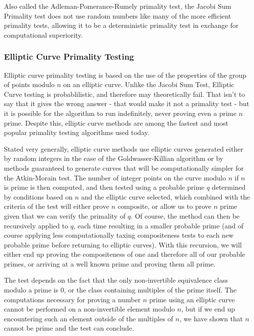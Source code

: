 \documentclass{article}
\begin{document}
 \par Also called the Adleman-Pomerance-Rumely primality test,  the Jacobi Sum Primality test does not use random numbers like many of the more efficient primality tests, allowing it to be a deterministic primality test in exchange for computational superiority.

\subsubsection*{Elliptic Curve Primality Testing}

Elliptic curve primality testing is based on the use of the properties of the group of points modulo $n$ on an elliptic curve. Unlike the Jacobi Sum Test, Elliptic Curve testing is probablilistic, and therefore may theoretically fail. That isn't to say that it gives the wrong answer - that would make it not a primality test - but it is possible for the algorithm to run indefinitely, never proving even a prime $n$ prime.  Despite this, elliptic curve methods are among the fastest and most popular primality testing algorithms used today.
\par Stated very generally, elliptic curve methods use elliptic curves generated either by random integers in the case of the Goldwasser-Killian algorithm or by methods guaranteed to generate curves that will be computationally simpler for the Atkin-Morain test. The number of integer points on the curve modulo $n$ if $n$ is prime is then computed, and then tested using a probable prime $q$ determined by conditions based on $n$ and the elliptic curve selected, which combined with the criteria of the test will either prove $n$ composite, or allow us to prove $n$ prime given that we can verify the primality of $q$. Of course, the method can then be recursively applied to $q$, each time resulting in a smaller probable prime (and of course applying less computationally taxing compositeness tests to each new probable prime before returning to elliptic curves). With this recursion, we will either end up proving the compositeness of one and therefore all of our probable primes, or arriving at a well known prime and proving them all prime. 
\par The test depends on the fact that the only non-invertible equivalence class modulo a prime is $0$, or the class containing multiples of the prime itself. The computations necessary for proving a number $n$ prime using an elliptic curve cannot be performed on a non-invertible element modulo $n$,  but if we end up encountering such an element outside of the multiples of $n$, we have shown that $n$ cannot be prime and the test can conclude. 
\end{document}
